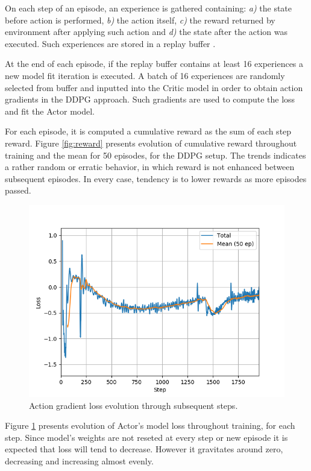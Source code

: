 \documentclass[peerreview,onecolumn]{IEEEtran}
\begin{document}
	 On each step of an episode, an experience is gathered containing: \textit{a)} the state before action is performed, \textit{b)} the action itself, \textit{c)} the reward returned by environment after applying such action and \textit{d)} the state after the action was executed. Such experiences are stored in a replay buffer \cite{rep_buffer}.
	 
	  At the end of each episode, if the replay buffer contains at least 16 experiences a new model fit iteration is executed. A batch of 16 experiences are randomly selected from buffer and inputted into the Critic model in order to obtain action gradients in the DDPG approach. Such gradients are used to compute the loss and fit the Actor model.
	  	  
	For each episode, it is computed a cumulative reward as the sum of each step reward. Figure \ref{fig:reward} presents evolution of cumulative reward throughout training and the mean for 50 episodes, for the DDPG setup. The trends indicates a rather random or erratic behavior, in which reward is not enhanced between subsequent episodes. In every case, tendency is to lower rewards as more episodes passed.
	
	\begin{figure}[!h]
		\centering
		\includegraphics[width=0.9\columnwidth]{img/loss.png} 
		\caption{Action gradient loss evolution through subsequent steps.}
		\label{fig:loss}
	\end{figure}
	
	Figure \ref{fig:loss} presents evolution of Actor's model loss throughout training, for each step. Since model's weights are not reseted at every step or new episode it is expected that loss will tend to decrease. However it gravitates around zero, decreasing and increasing almost evenly.
	
\end{document}
